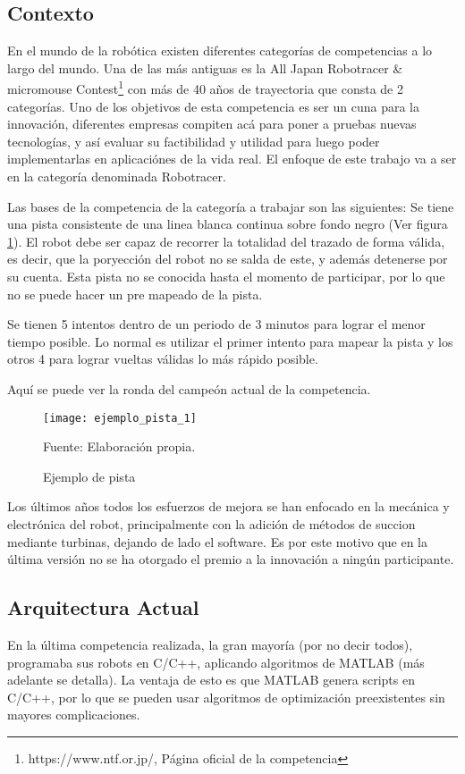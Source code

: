 
\subsection{Contexto}

En el mundo de la robótica existen diferentes categorías de competencias a lo largo del mundo. Una de las más antiguas es la All Japan Robotracer \& micromouse Contest\footnote{https://www.ntf.or.jp/, Página oficial de la competencia} con más de 40 años de trayectoria que consta de 2 categorías. Uno de los objetivos de esta competencia es ser un cuna para la innovación, diferentes empresas compiten acá para poner a pruebas nuevas tecnologías, y así evaluar su factibilidad y utilidad para luego poder implementarlas en aplicaciónes de la vida real. El enfoque de este trabajo va a ser en la categoría denominada Robotracer.

Las bases de la competencia de la categoría a trabajar son las siguientes: Se tiene una pista consistente de una linea blanca continua sobre fondo negro (Ver figura \ref{fig:pista1}). El robot debe ser capaz de recorrer la totalidad del trazado de forma válida, es decir, que la poryección del robot no se salda de este, y además detenerse por su cuenta. Esta pista no se conocida hasta el momento de participar, por lo que no se puede hacer un pre mapeado de la pista.

Se tienen 5 intentos dentro de un periodo de 3 minutos para lograr el menor tiempo posible. Lo normal es utilizar el primer intento para mapear la pista y los otros 4 para lograr vueltas válidas lo más rápido posible.

Aquí se puede ver la ronda del campeón actual de la competencia. \cite{ganador2023}

\begin{figure}[h]
\centering
\texttt{[image: ejemplo\_pista\_1]}
\caption{\label{fig:pista1} Ejemplo de pista} Fuente: Elaboración propia.
\end{figure}

Los últimos años todos los esfuerzos de mejora se han enfocado en la mecánica y electrónica del robot, principalmente con la adición de métodos de succion mediante turbinas, dejando de lado el software. Es por este motivo que en la última versión no se ha otorgado el premio a la innovación a ningún participante.

\subsection{Arquitectura Actual}
En la última competencia realizada, la gran mayoría (por no decir todos), programaba sus robots en C/C++, aplicando algoritmos de MATLAB (más adelante se detalla). La ventaja de esto es que MATLAB genera scripts en C/C++, por lo que se pueden usar algoritmos de optimización preexistentes sin mayores complicaciones.



